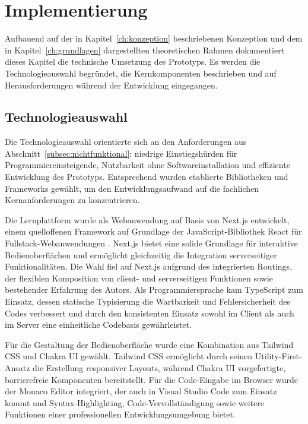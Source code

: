 \chapter{\textbf{Implementierung}}\label{ch:implementierung}

Aufbauend auf der in Kapitel~\ref{ch:konzeption} beschriebenen Konzeption und dem in Kapitel~\ref{ch:grundlagen} dargestellten theoretischen Rahmen dokumentiert dieses Kapitel die technische Umsetzung des Prototyps. Es werden die Technologieauswahl begründet, die Kernkomponenten beschrieben und auf Herausforderungen während der Entwicklung eingegangen.



\section{Technologieauswahl}\label{sec:techstack}

Die Technologieauswahl orientierte sich an den Anforderungen aus Abschnitt~\ref{subsec:nichtfunktional}: niedrige Einstiegshürden für Programmiereinsteigende, Nutzbarkeit ohne Softwareinstallation und effiziente Entwicklung des Prototyps.
Entsprechend wurden etablierte Bibliotheken und Frameworks gewählt, um den Entwicklungsaufwand auf die fachlichen Kernanforderungen zu konzentrieren.

Die Lernplattform wurde als Webanwendung auf Basis von Next.js entwickelt, einem quelloffenen Framework auf Grundlage der JavaScript-Bibliothek React \cite{react} für Fullstack-Webanwendungen \cite{nextjs}.
Next.js bietet eine solide Grundlage für interaktive Bedienoberflächen und ermöglicht gleichzeitig die Integration serverseitiger Funktionalitäten.
Die Wahl fiel auf Next.js aufgrund des integrierten Routings, der flexiblen Komposition von client- und serverseitigen Funktionen sowie bestehender Erfahrung des Autors.
Als Programmiersprache kam TypeScript \cite{typescript} zum Einsatz, dessen statische Typisierung die Wartbarkeit und Fehlersicherheit des Codes verbessert und durch den konsistenten Einsatz sowohl im Client als auch im Server eine einheitliche Codebasis gewährleistet.

Für die Gestaltung der Bedienoberfläche wurde eine Kombination aus Tailwind CSS \cite{tailwind} und Chakra UI \cite{chakra} gewählt.
Tailwind CSS ermöglicht durch seinen Utility-First-Ansatz die Erstellung responsiver Layouts, während Chakra UI vorgefertigte, barrierefreie Komponenten bereitstellt.
Für die Code-Eingabe im Browser wurde der Monaco Editor \cite{monaco} integriert, der auch in Visual Studio Code \cite{vscode} zum Einsatz kommt und Syntax-Highlighting, Code-Vervollständigung sowie weitere Funktionen einer professionellen Entwicklungsumgebung bietet.

